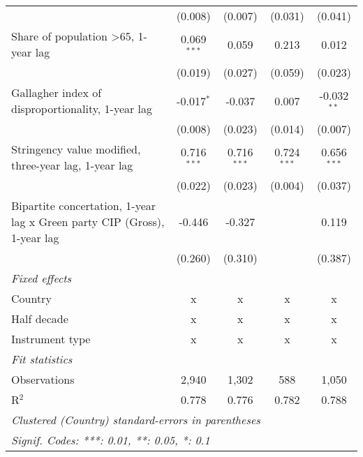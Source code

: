\begin{table}[htbp]
\begin{tabular}{lcccc}
                                                                               & (0.008)       & (0.007)         & (0.031)         & (0.041)\\   
      Share of population >65, 1-year lag                                      & 0.069$^{***}$ & 0.059           & 0.213           & 0.012\\   
                                                                               & (0.019)       & (0.027)         & (0.059)         & (0.023)\\   
      Gallagher index of disproportionality, 1-year lag                        & -0.017$^{*}$  & -0.037          & 0.007           & -0.032$^{**}$\\   
                                                                               & (0.008)       & (0.023)         & (0.014)         & (0.007)\\   
      Stringency value modified, three-year lag, 1-year lag                    & 0.716$^{***}$ & 0.716$^{***}$   & 0.724$^{***}$   & 0.656$^{***}$\\   
                                                                               & (0.022)       & (0.023)         & (0.004)         & (0.037)\\   
      Bipartite concertation, 1-year lag x Green party CIP (Gross), 1-year lag & -0.446        & -0.327          &                 & 0.119\\   
                                                                               & (0.260)       & (0.310)         &                 & (0.387)\\   
      \emph{Fixed effects}\\
      Country                                                                  & x             & x               & x               & x\\  
      Half decade                                                              & x             & x               & x               & x\\  
      Instrument type                                                          & x             & x               & x               & x\\  
      \midrule \emph{Fit statistics}\\
      Observations                                                             & 2,940         & 1,302           & 588             & 1,050\\  
      R$^2$                                                                    & 0.778         & 0.776           & 0.782           & 0.788\\  
      \midrule
      \multicolumn{5}{l}{\emph{Clustered (Country) standard-errors in parentheses}}\\
      \multicolumn{5}{l}{\emph{Signif. Codes: ***: 0.01, **: 0.05, *: 0.1}}\\
   \end{tabular}
\end{table}


